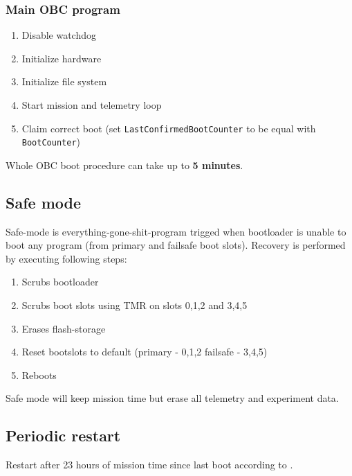 \subsubsection{Main OBC program}
\begin{enumerate}
	\item Disable watchdog
	\item Initialize hardware 
	\item Initialize file system
	\item Start mission and telemetry loop
	\item Claim correct boot (set \texttt{LastConfirmedBootCounter} to be equal with \texttt{BootCounter})
\end{enumerate}

Whole OBC boot procedure can take up to \textbf{5 minutes}. 

\subsection{Safe mode}
Safe-mode is everything-gone-shit-program trigged when bootloader is unable to boot any program (from primary and failsafe boot slots). Recovery is performed by executing following steps:
\begin{enumerate}
	\item Scrubs bootloader
	\item Scrubs boot slots using TMR on slots 0,1,2 and 3,4,5
	\item Erases flash-storage
	\item Reset bootslots to default (primary - 0,1,2 failsafe - 3,4,5)
	\item Reboots
\end{enumerate}

Safe mode will keep mission time but erase all telemetry and experiment data. 


\subsection{Periodic restart}
Restart after 23 hours of mission time since last boot according to . 
